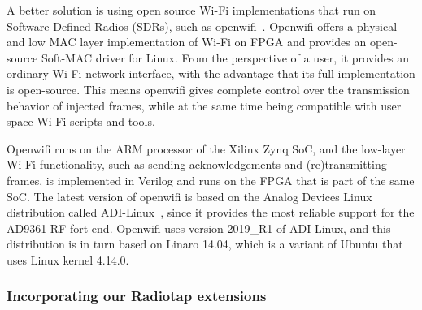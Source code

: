 \documentclass[sigconf]{acmart}
\newcommand{\wifi}{\mbox{Wi-Fi}}
\begin{document}
A better solution is using open source \wifi{} implementations that run on Software Defined Radios (SDRs), such as openwifi~\cite{jiao2020openwifi}.
Openwifi offers a physical and low MAC layer implementation of \wifi{} on FPGA and provides an open-source Soft-MAC driver for Linux.
From the perspective of a user, it provides an ordinary \wifi{} network interface, with the advantage that its full implementation is open-source.
This means openwifi gives complete control over the transmission behavior of injected frames, while at the same time being compatible with user space \wifi{} scripts and tools.


Openwifi runs on the ARM processor of the Xilinx Zynq SoC, and the low-layer \wifi{} functionality, such as sending acknowledgements and (re)transmitting frames, is implemented in Verilog and runs on the FPGA that is part of the same SoC.
The latest version of openwifi is based on the Analog Devices Linux distribution called ADI-Linux~\cite{adi-linux}, since it provides the most reliable support for the AD9361 RF fort-end.
Openwifi uses version 2019\_R1 of ADI-Linux, and this distribution is in turn based on Linaro 14.04, which is a variant of Ubuntu that uses Linux kernel 4.14.0.


\subsubsection{Incorporating our Radiotap extensions}
\end{document}
